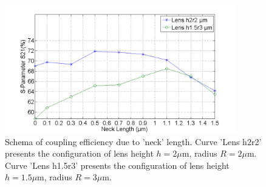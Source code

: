\begin{figure}[!ht]
\centering
\includegraphics[width=0.9\textwidth]{bilder/s21_neck}
\caption {Schema of coupling efficiency due to 'neck' length. Curve 'Lens h2r2' presents the configuration of lens height $h=2\mu$m, radius $R=2\mu$m. Curve 'Lens h1.5r3' presents the configuration of lens height $h=1.5\mu$m, radius $R=3\mu$m.}
\label{fig:s21_neck}
\end{figure}

